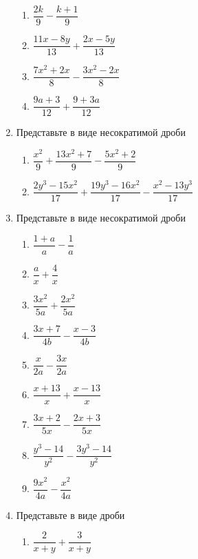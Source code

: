\documentclass[10pt, a4paper]{article}
\begin{document}
\begin{enumerate}
\begin{multicols}{3}
\begin{enumerate}
			\item $\dfrac{2k}{9}-\dfrac{k+1}{9}$ 
			\item $\dfrac{11x-8y}{13}+\dfrac{2x-5y}{13}$ 
			\item $\dfrac{7x^2+2x}{8}-\dfrac{3x^2-2x}{8}$ 
			\item $\dfrac{9a+3}{12}+\dfrac{9+3a}{12}$ 
		\end{enumerate}	
	\end{multicols}
	\item Представьте в виде несократимой дроби
	\begin{multicols}{2}
		\begin{enumerate}
			\item $\dfrac{x^2}{9}+\dfrac{13x^2+7}{9}-\dfrac{5x^2+2}{9}$ 
			\item $\dfrac{2y^3-15x^2}{17}+\dfrac{19y^3-16x^2}{17}-\dfrac{x^2-13y^3}{17}$ 
		\end{enumerate}	
	\end{multicols}
	\item Представьте в виде несократимой дроби
	\begin{multicols}{3}
		\begin{enumerate}
			\item $\dfrac{1+a}{a}-\dfrac{1}{a}$ 
			\item $\dfrac{a}{x}+\dfrac{4}{x}$ 
			\item $\dfrac{3x^2}{5a}+\dfrac{2x^2}{5a}$ 
			\item $\dfrac{3x+7}{4b}-\dfrac{x-3}{4b}$ 
			\item $\dfrac{x}{2a}-\dfrac{3x}{2a}$ 
			\item $\dfrac{x+13}{x}+\dfrac{x-13}{x}$ 
			\item $\dfrac{3x+2}{5x}-\dfrac{2x+3}{5x}$ 
			\item $\dfrac{y^3-14}{y^2}-\dfrac{3y^3-14}{y^2}$ 
			\item $\dfrac{9x^2}{4a}-\dfrac{x^2}{4a}$ 
		\end{enumerate}	
	\end{multicols}
	\item Представьте в виде дроби
	\begin{multicols}{3}
		\begin{enumerate}
			\item $\dfrac{2}{x+y}+\dfrac{3}{x+y}$ 

\end{enumerate}
\end{multicols}
\end{enumerate}
\end{document}
